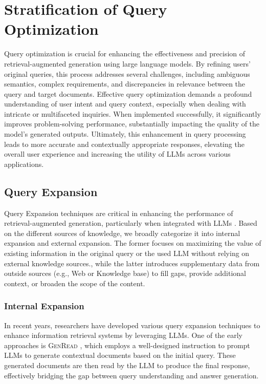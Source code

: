 \documentclass[11pt]{article}
\begin{document}
\section{Stratification of Query Optimization}\label{Stratification}
Query optimization is crucial for enhancing the effectiveness and precision of retrieval-augmented generation using large language models. By refining users' original queries, this process addresses several challenges, including ambiguous semantics, complex requirements, and discrepancies in relevance between the query and target documents. Effective query optimization demands a profound understanding of user intent and query context, especially when dealing with intricate or multifaceted inquiries. When implemented successfully, it significantly improves problem-solving performance, substantially impacting the quality of the model's generated outputs. Ultimately, this enhancement in query processing leads to more accurate and contextually appropriate responses, elevating the overall user experience and increasing the utility of LLMs across various applications.

\subsection{Query Expansion}\label{Expansion}
Query Expansion techniques \cite{query_expansion_survey1} are critical in enhancing the performance of retrieval-augmented generation, particularly when integrated with LLMs \cite{query_expansion_survey2}. Based on the different sources of knowledge, we broadly categorize it into internal expansion and external expansion. The former focuses on maximizing the value of existing information in the original query or the used LLM without relying on external knowledge sources., while the latter introduces supplementary data from outside sources (e.g., Web or Knowledge base) to fill gaps, provide additional context, or broaden the scope of the content.

\subsubsection{Internal Expansion}\label{Internal}
In recent years, researchers have developed various query expansion techniques to enhance information retrieval systems by leveraging LLMs. One of the early approaches is \textsc{GenRead} \cite{GenRead}, which employs a well-designed instruction to prompt LLMs to generate contextual documents based on the initial query. These generated documents are then read by the LLM to produce the final response, effectively bridging the gap between query understanding and answer generation.
\end{document}
